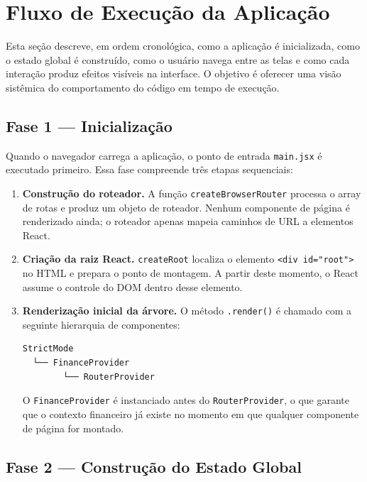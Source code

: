 \documentclass{article}
\begin{document}
\section{Fluxo de Execução da Aplicação}

Esta seção descreve, em ordem cronológica, como a aplicação é inicializada, como o estado global é construído, como o usuário navega entre as telas e como cada interação produz efeitos visíveis na interface. O objetivo é oferecer uma visão sistêmica do comportamento do código em tempo de execução.

\subsection{Fase 1 — Inicialização}

Quando o navegador carrega a aplicação, o ponto de entrada \texttt{main.jsx} é executado primeiro. Essa fase compreende três etapas sequenciais:

\begin{enumerate}
  \item \textbf{Construção do roteador.} A função \texttt{createBrowserRouter} processa o array de rotas e produz um objeto de roteador. Nenhum componente de página é renderizado ainda; o roteador apenas mapeia caminhos de URL a elementos React.

  \item \textbf{Criação da raiz React.} \texttt{createRoot} localiza o elemento \texttt{<div id="root">} no HTML e prepara o ponto de montagem. A partir deste momento, o React assume o controle do DOM dentro desse elemento.

  \item \textbf{Renderização inicial da árvore.} O método \texttt{.render()} é chamado com a seguinte hierarquia de componentes:

\begin{verbatim}
StrictMode
  └── FinanceProvider
        └── RouterProvider
\end{verbatim}

  O \texttt{FinanceProvider} é instanciado antes do \texttt{RouterProvider}, o que garante que o contexto financeiro já existe no momento em que qualquer componente de página for montado.
\end{enumerate}

\subsection{Fase 2 — Construção do Estado Global}
\end{document}
